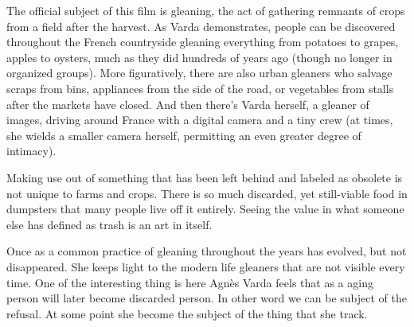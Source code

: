 
The official subject of this film is gleaning, the act of gathering remnants of crops from a field after the harvest. As Varda demonstrates, people can be discovered throughout the French countryside gleaning everything from potatoes to grapes, apples to oysters, much as they did hundreds of years ago (though no longer in organized groups). More figuratively, there are also urban gleaners who salvage scraps from bins, appliances from the side of the road, or vegetables from stalls after the markets have closed. And then there’s Varda herself, a gleaner of images, driving around France with a digital camera and a tiny crew (at times, she wields a smaller camera herself, permitting an even greater degree of intimacy).

Making use out of something that has been left behind and labeled as obsolete is not unique to farms and crops. There is so much discarded, yet still-viable food in dumpsters that many people live off it entirely. Seeing the value in what someone else has defined as trash is an art in itself.

Once as a common practice of gleaning throughout the years has evolved, but not disappeared. She keeps light to the modern life gleaners that are not visible every time. One of the interesting thing is here Agnès Varda feels that as a aging person will later become discarded person. In other word we can be subject of the refusal. At some point she become the subject of the thing that she track. 


